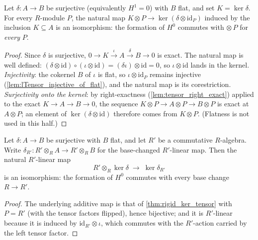 \begin{theorem}
  \label{thm:rigid_ker_tensor}
  \leanok
  Let \(\delta : A \to B\) be surjective (equivalently \(H^1 = 0\)) with \(B\) flat, and
  set \(K = \ker \delta\). For every \(R\)-module \(P\), the natural map
  \(K \otimes P \to \ker(\delta \otimes \mathrm{id}_P)\) induced by the inclusion
  \(K \subseteq A\) is an isomorphism: the formation of \(H^0\) commutes with
  \(\otimes\, P\) for \emph{every} \(P\).
\end{theorem}
\begin{proof}
  \leanok
  Since \(\delta\) is surjective, \(0 \to K \xrightarrow{\iota} A \xrightarrow{\delta}
  B \to 0\) is exact. The natural map is well defined:
  \((\delta \otimes \mathrm{id}) \circ (\iota \otimes \mathrm{id}) =
  (\delta \iota) \otimes \mathrm{id} = 0\), so \(\iota \otimes \mathrm{id}\) lands in
  the kernel. \emph{Injectivity}: the cokernel \(B\) of \(\iota\) is flat, so
  \(\iota \otimes \mathrm{id}_P\) remains injective
  (\ref{lem:lTensor_injective_of_flat}), and the natural map is its corestriction.
  \emph{Surjectivity onto the kernel}: by right-exactness
  (\ref{lem:tensor_right_exact}) applied to the exact \(K \to A \to B \to 0\), the
  sequence \(K \otimes P \to A \otimes P \to B \otimes P\) is exact at \(A \otimes P\);
  an element of \(\ker(\delta \otimes \mathrm{id})\) therefore comes from
  \(K \otimes P\). (Flatness is not used in this half.)
\end{proof}

\begin{theorem}
  \label{thm:rigid_ker_baseChange}
  \leanok
  Let \(\delta : A \to B\) be surjective with \(B\) flat, and let \(R'\) be a
  commutative \(R\)-algebra. Write \(\delta_{R'} : R' \otimes_R A \to R' \otimes_R B\)
  for the base-changed \(R'\)-linear map. Then the natural \(R'\)-linear map
  \[
    R' \otimes_R \ker \delta \;\longrightarrow\; \ker \delta_{R'}
  \]
  is an isomorphism: the formation of \(H^0\) commutes with every base change
  \(R \to R'\).
\end{theorem}
\begin{proof}
  \leanok
  The underlying additive map is that of \ref{thm:rigid_ker_tensor} with \(P = R'\)
  (with the tensor factors flipped), hence bijective; and it is \(R'\)-linear because
  it is induced by \(\mathrm{id}_{R'} \otimes \iota\), which commutes with the
  \(R'\)-action carried by the left tensor factor.
\end{proof}

